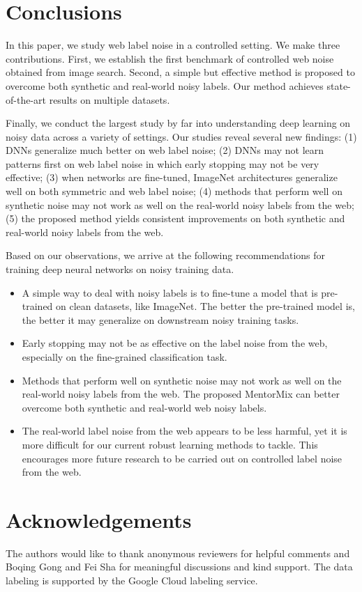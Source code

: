 \documentclass{article}
\begin{document}
\section{Conclusions}
In this paper, we study web label noise in a controlled setting. We make three contributions. First, we establish the first benchmark of controlled web noise obtained from image search. Second, a simple but effective method is proposed to overcome both synthetic and real-world noisy labels. Our method achieves state-of-the-art results on multiple datasets. 

Finally, we conduct the largest study by far into understanding deep learning on noisy data across a variety of settings. Our studies reveal several new findings: (1) DNNs generalize much better on web label noise; (2) DNNs may not learn patterns first on web label noise in which early stopping may not be very effective; (3) when networks are fine-tuned, ImageNet architectures generalize well on both symmetric and web label noise; (4) methods that perform well on synthetic noise may not work as well on the real-world noisy labels from the web; (5) the proposed method yields consistent improvements on both synthetic and real-world noisy labels from the web.

Based on our observations, we arrive at the following recommendations for training deep neural networks on noisy training data.
\begin{itemize}
    \item A simple way to deal with noisy labels is to fine-tune a model that is pre-trained on clean datasets, like ImageNet. The better the pre-trained model is, the better it may generalize on downstream noisy training tasks.
    \item Early stopping may not be as effective on the label noise from the web, especially on the fine-grained classification task.
    \item Methods that perform well on synthetic noise may not work as well on the real-world noisy labels from the web. The proposed MentorMix can better overcome both synthetic and real-world web noisy labels.
    \item The real-world label noise from the web appears to be less harmful, yet it is more difficult for our current robust learning methods to tackle. This encourages more future research to be carried out on controlled label noise from the web. 
\end{itemize}

\section*{Acknowledgements}
The authors would like to thank anonymous reviewers for helpful comments and Boqing Gong and Fei Sha for meaningful discussions and kind support. The data labeling is supported by the Google Cloud labeling service.





\end{document}
